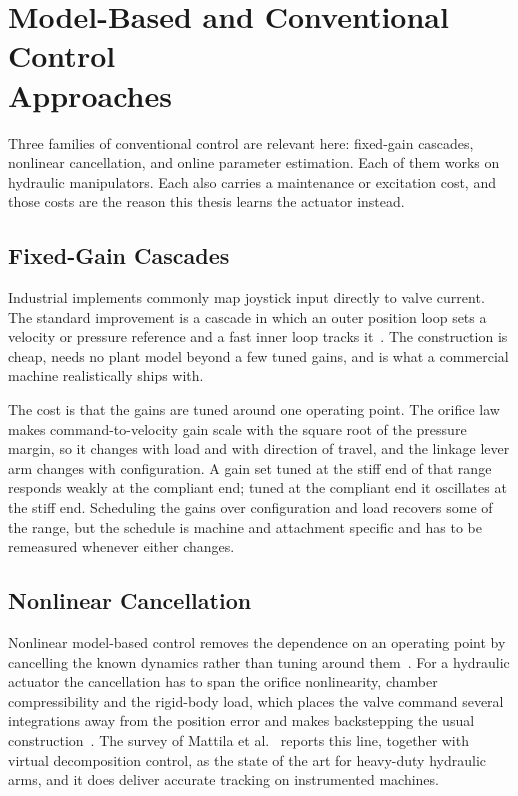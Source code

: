 \section[Model-Based and Conventional Control Approaches]
  {Model-Based and Conventional Control\\Approaches}
\label{sec:fund:conventional-control}

Three families of conventional control are relevant here: fixed-gain cascades,
nonlinear cancellation, and online parameter estimation. Each of them works on
hydraulic manipulators. Each also carries a maintenance or excitation cost, and
those costs are the reason this thesis learns the actuator instead.

\subsection{Fixed-Gain Cascades}

Industrial implements commonly map joystick input directly to valve current.
The standard improvement is a cascade in which an outer position loop sets a
velocity or pressure reference and a fast inner loop tracks
it~\cite{jelali2003hydraulic}. The construction is cheap, needs no plant model
beyond a few tuned gains, and is what a commercial machine realistically ships
with.

The cost is that the gains are tuned around one operating point. The orifice
law makes command-to-velocity gain scale with the square root of the pressure
margin, so it changes with load and with direction of travel, and the linkage
lever arm changes with configuration. A gain set tuned at the stiff end of that
range responds weakly at the compliant end; tuned at the compliant end it
oscillates at the stiff end. Scheduling the gains over configuration and load
recovers some of the range, but the schedule is machine and attachment
specific and has to be remeasured whenever either changes.

\subsection{Nonlinear Cancellation}

Nonlinear model-based control removes the dependence on an operating point by
cancelling the known dynamics rather than tuning around
them~\cite{slotine1991applied}. For a hydraulic actuator the cancellation has
to span the orifice nonlinearity, chamber compressibility and the rigid-body
load, which places the valve command several integrations away from the
position error and makes backstepping the usual
construction~\cite{jelali2003hydraulic}. The survey of Mattila et
al.~\cite{mattila2017survey} reports this line, together with virtual
decomposition control, as the state of the art for heavy-duty hydraulic arms,
and it does deliver accurate tracking on instrumented machines.

